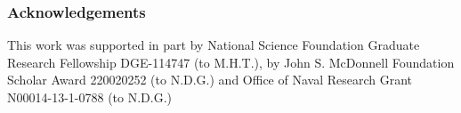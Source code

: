 \documentclass[10pt,letterpaper]{article}
\begin{document}
%
\subsubsection*{Acknowledgements}

This work was supported in part by National Science Foundation Graduate Research Fellowship DGE-114747 (to M.H.T.),
by John S. McDonnell Foundation Scholar Award 220020252 (to N.D.G.) and 
Office of Naval Research Grant N00014-13-1-0788 (to N.D.G.)

%

%
%
%
%
%
%
%
%
%
%
%
\end{document}
